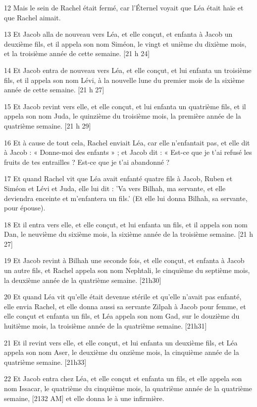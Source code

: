 \par 12 Mais le sein de Rachel était fermé, car l'Éternel voyait que Léa était haïe et que Rachel aimait.
\par 13 Et Jacob alla de nouveau vers Léa, et elle conçut, et enfanta à Jacob un deuxième fils, et il appela son nom Siméon, le vingt et unième du dixième mois, et la troisième année de cette semaine. [21 h 24]
\par 14 Et Jacob entra de nouveau vers Léa, et elle conçut, et lui enfanta un troisième fils, et il appela son nom Lévi, à la nouvelle lune du premier mois de la sixième année de cette semaine. [21 h 27]
\par 15 Et Jacob revint vers elle, et elle conçut, et lui enfanta un quatrième fils, et il appela son nom Juda, le quinzième du troisième mois, la première année de la quatrième semaine. [21 h 29]
\par 16 Et à cause de tout cela, Rachel enviait Léa, car elle n'enfantait pas, et elle dit à Jacob : « Donne-moi des enfants » ; et Jacob dit : « Est-ce que je t'ai refusé les fruits de tes entrailles ? Est-ce que je t'ai abandonné ?
\par 17 Et quand Rachel vit que Léa avait enfanté quatre fils à Jacob, Ruben et Siméon et Lévi et Juda, elle lui dit : 'Va vers Bilhah, ma servante, et elle deviendra enceinte et m'enfantera un fils.' (Et elle lui donna Bilhah, sa servante, pour épouse).
\par 18 Et il entra vers elle, et elle conçut, et lui enfanta un fils, et il appela son nom Dan, le neuvième du sixième mois, la sixième année de la troisième semaine. [21 h 27]
\par 19 Et Jacob revint à Bilhah une seconde fois, et elle conçut, et enfanta à Jacob un autre fils, et Rachel appela son nom Nephtali, le cinquième du septième mois, la deuxième année de la quatrième semaine. [21h30]
\par 20 Et quand Léa vit qu'elle était devenue stérile et qu'elle n'avait pas enfanté, elle envia Rachel, et elle donna aussi sa servante Zilpah à Jacob pour femme, et elle conçut et enfanta un fils, et Léa appela son nom Gad, sur le douzième du huitième mois, la troisième année de la quatrième semaine. [21h31]
\par 21 Et il revint vers elle, et elle conçut, et lui enfanta un deuxième fils, et Léa appela son nom Aser, le deuxième du onzième mois, la cinquième année de la quatrième semaine. [21h33]
\par 22 Et Jacob entra chez Léa, et elle conçut et enfanta un fils, et elle appela son nom Issacar, le quatrième du cinquième mois, la quatrième année de la quatrième semaine, [2132 AM] et elle donna le à une infirmière.
